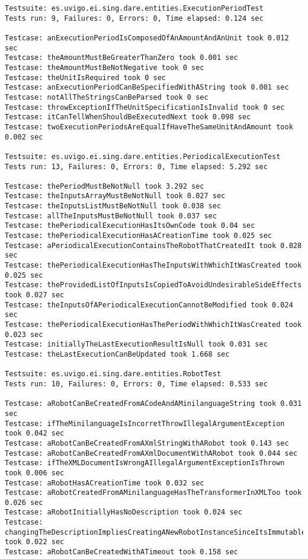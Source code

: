 \begin{table}[hbp]
\begingroup
    \fontsize{9pt}{11pt}\selectfont
\begin{verbatim}
Testsuite: es.uvigo.ei.sing.dare.entities.ExecutionPeriodTest
Tests run: 9, Failures: 0, Errors: 0, Time elapsed: 0.124 sec

Testcase: anExecutionPeriodIsComposedOfAnAmountAndAnUnit took 0.012 sec
Testcase: theAmountMustBeGreaterThanZero took 0.001 sec
Testcase: theAmountMustBeNotNegative took 0 sec
Testcase: theUnitIsRequired took 0 sec
Testcase: anExecutionPeriodCanBeSpecifiedWithAString took 0.001 sec
Testcase: notAllTheStringsCanBeParsed took 0 sec
Testcase: throwExceptionIfTheUnitSpecificationIsInvalid took 0 sec
Testcase: itCanTellWhenShouldBeExecutedNext took 0.098 sec
Testcase: twoExecutionPeriodsAreEqualIfHaveTheSameUnitAndAmount took
0.002 sec

Testsuite: es.uvigo.ei.sing.dare.entities.PeriodicalExecutionTest
Tests run: 13, Failures: 0, Errors: 0, Time elapsed: 5.292 sec

Testcase: thePeriodMustBeNotNull took 3.292 sec
Testcase: theInputsArrayMustBeNotNull took 0.027 sec
Testcase: theInputsListMustBeNotNull took 0.038 sec
Testcase: allTheInputsMustBeNotNull took 0.037 sec
Testcase: thePeriodicalExecutionHasItsOwnCode took 0.04 sec
Testcase: thePeriodicalExecutionHasACreationTime took 0.025 sec
Testcase: aPeriodicalExecutionContainsTheRobotThatCreatedIt took 0.028 sec
Testcase: thePeriodicalExecutionHasTheInputsWithWhichItWasCreated took 0.025 sec
Testcase: theProvidedListOfInputsIsCopiedToAvoidUndesirableSideEffects took 0.027 sec
Testcase: theInputsOfAPeriodicalExecutionCannotBeModified took 0.024 sec
Testcase: thePeriodicalExecutionHasThePeriodWithWhichItWasCreated took 0.023 sec
Testcase: initiallyTheLastExecutionResultIsNull took 0.031 sec
Testcase: theLastExecutionCanBeUpdated took 1.668 sec

Testsuite: es.uvigo.ei.sing.dare.entities.RobotTest
Tests run: 10, Failures: 0, Errors: 0, Time elapsed: 0.533 sec

Testcase: aRobotCanBeCreatedFromACodeAndAMinilanguageString took 0.031 sec
Testcase: ifTheMinilanguageIsIncorretThrowIllegalArgumentException took 0.042 sec
Testcase: aRobotCanBeCreatedFromAXmlStringWithARobot took 0.143 sec
Testcase: aRobotCanBeCreatedFromAXmlDocumentWithARobot took 0.044 sec
Testcase: ifTheXMLDocumentIsWrongAIllegalArgumentExceptionIsThrown took 0.006 sec
Testcase: aRobotHasACreationTime took 0.032 sec
Testcase: aRobotCreatedFromAMinilanguageHasTheTransformerInXMLToo took 0.026 sec
Testcase: aRobotInitiallyHasNoDescription took 0.024 sec
Testcase: changingTheDescriptionImpliesCreatingANewRobotInstanceSinceItsImmutable took 0.022 sec
Testcase: aRobotCanBeCreatedWithATimeout took 0.158 sec

\end{verbatim}
\endgroup
\caption{Junit Test DARE-domain}
\label{junit_dare-domain}
\end{table}

